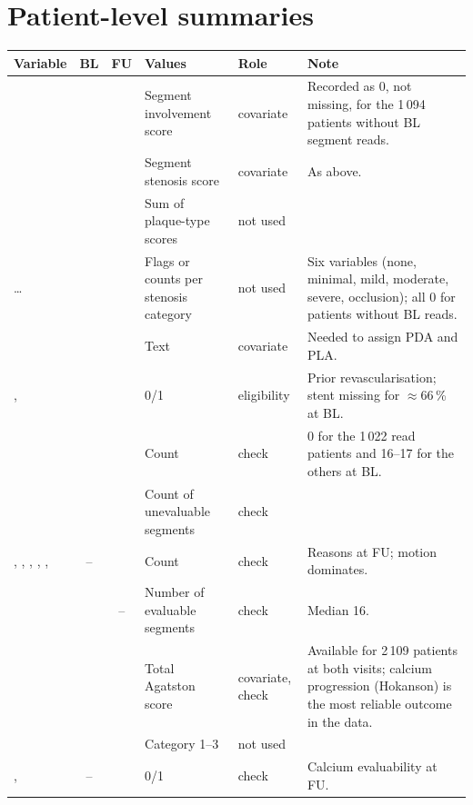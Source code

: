 \documentclass[11pt,a4paper]{article}
\newcommand{\yes}{\checkmark}
\newcommand{\no}{--}
\begin{document}
\section{Patient-level summaries}

\begin{longtable}{L{4.3cm} c c L{6.2cm} L{2.2cm} L{7.0cm}}
\toprule
Variable & BL & FU & Values & Role & Note \\
\midrule
\endhead
{} & \yes & \yes & Segment involvement score & covariate &
  Recorded as 0, not missing, for the 1\,094 patients without BL segment reads. \\
 & \yes & \yes & Segment stenosis score & covariate & As above. \\
 & \yes & \yes & Sum of plaque-type scores & not used & \\
 \dots\  & \yes & \yes & Flags or counts per stenosis category & not used &
  Six variables (none, minimal, mild, moderate, severe, occlusion); all 0 for patients without BL reads. \\
 & \yes & \yes & Text & covariate & Needed to assign PDA and PLA. \\
,  & \yes & \yes & 0/1 & eligibility & Prior revascularisation; stent missing for $\approx$66\,\% at BL. \\
 & \yes & \yes & Count & check & 0 for the 1\,022 read patients and 16--17 for the others at BL. \\
 & \yes & \yes & Count of unevaluable segments & check & \\
, , , , ,  & \no & \yes & Count & check &
  Reasons at FU; motion dominates. \\
 & \yes & \no & Number of evaluable segments & check & Median 16. \\
 & \yes & \yes & Total Agatston score & covariate, check &
  Available for 2\,109 patients at both visits; calcium progression (Hokanson) is the most reliable outcome in the data. \\
 & \yes & \yes & Category 1--3 & not used & \\
,  & \no & \yes & 0/1 & check & Calcium evaluability at FU. \\
\bottomrule
\end{longtable}
\end{document}
